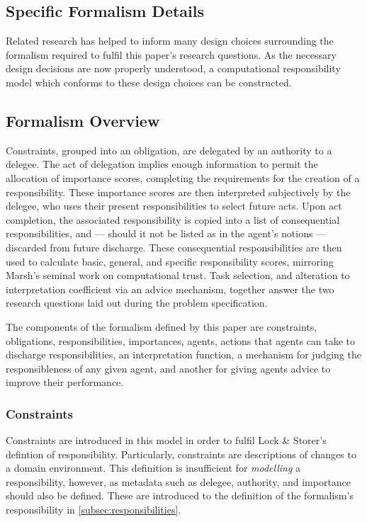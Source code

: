 \subsection{Specific Formalism Details}

Related research has helped to inform many design choices surrounding the formalism required to fulfil this paper's research questions. As the necessary design decisions are now properly understood, a computational responsibility model which conforms to these design choices can be constructed.\par

\subsection{Formalism Overview}
Constraints, grouped into an obligation, are delegated by an authority to a delegee. The act of delegation implies enough information to permit the allocation of importance scores, completing the requirements for the creation of a responsibility. These importance scores are then interpreted subjectively by the delegee, who uses their present responsibilities to select future acts. Upon act completion, the associated responsibility is copied into a list of consequential responsibilities, and --- should it not be listed as in the agent's notions --- discarded from future discharge. These consequential responsibilities are then used to calculate basic, general, and specific responsibility scores, mirroring Marsh's seminal work on computational trust. Task selection, and alteration to interpretation coefficient via an advice mechanism, together answer the two research questions laid out during the problem specification.\par

The components of the formalism defined by this paper are constraints, obligations, responsibilities, importances, agents, actions that agents can take to discharge responsibilities, an interpretation function, a mechanism for judging the responsibleness of any given agent, and another for giving agents advice to improve their performance.\par

\subsubsection{Constraints}  %
Constraints are introduced in this model in order to fulfil Lock \& Storer's defintion of responsibility. Particularly, constraints are descriptions of changes to a domain environment. This definition is insufficient for \emph{modelling} a responsibility, however, as metadata such as delegee, authority, and importance should also be defined. These are introduced to the definition of the formalism's responsibility in \cref{subsec:responsibilities}.\par

